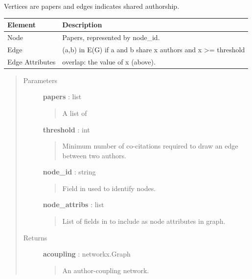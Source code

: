 \documentclass[letterpaper,10pt,english]{sphinxmanual}
\begin{document}
\begin{fulllineitems}
\label{tethne.networks:tethne.networks.papers.author_coupling}
Vertices are papers and edges indicates shared authorship.

\begin{tabulary}{\linewidth}{|L|L|}
\hline
\textbf{
Element
} & \textbf{
Description
}\\\hline

Node
 & 
Papers, represented by node\_id.
\\\hline

Edge
 & 
(a,b) in E(G) if a and b share x authors and x \textgreater{}=
threshold
\\\hline

Edge Attributes
 & 
overlap: the value of x (above).
\\\hline
\end{tabulary}

\begin{quote}\begin{description}
\item[{Parameters }] \leavevmode
\textbf{papers} : list
\begin{quote}

A list of {\hyperref[tethne:tethne.data.Paper]{}}
\end{quote}

\textbf{threshold} : int
\begin{quote}

Minimum number of co-citations required to draw an edge between two
authors.
\end{quote}

\textbf{node\_id} : string
\begin{quote}

Field in {\hyperref[tethne:tethne.data.Paper]{}} used to identify nodes.
\end{quote}

\textbf{node\_attribs} : list
\begin{quote}

List of fields in {\hyperref[tethne:tethne.data.Paper]{}} to include as node attributes in
graph.
\end{quote}

\item[{Returns }] \leavevmode
\textbf{acoupling} : networkx.Graph
\begin{quote}

An author-coupling network.
\end{quote}

\end{description}\end{quote}

\end{fulllineitems}
\end{document}
